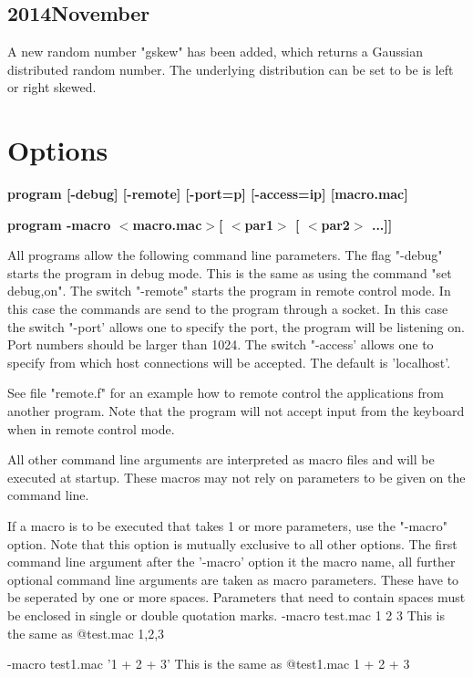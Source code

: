 \subsection*{2014November}
\par
A new random number "gskew" has been added, which returns a 
Gaussian distributed random number. The underlying distribution 
can be set to be is left or right skewed. 
\section{Options}
{\bf program [-debug] [-remote] [-port=p] [-access=ip] [macro.mac] \par }
{\bf program -macro $ <$macro.mac$> $[ $ <$par1$> $ [ $ <$par2$> $ ...]] \par }
\par
\vspace{3pt}
All programs allow the following command line parameters. The flag 
"-debug" starts the program in debug mode. This is the same as using 
the command "set debug,on". The switch "-remote" starts the program 
in remote control mode. In this case the commands are send to the 
program through a socket. In this case the switch "-port' allows one 
to specify the port, the program will be listening on. Port numbers 
should be larger than 1024. The switch "-access' allows one to specify 
from which host connections will be accepted. The default is 
'localhost'. 
\par
See file "remote.f" for an example how to remote control the 
applications from another program. Note that the program will not 
accept input from the keyboard when in remote control mode. 
\par
All other command line arguments are interpreted as macro files 
and will be executed at startup. These macros may not rely on 
parameters to be given on the command line. 
\par
If a macro is to be executed that takes 1 or more parameters, use 
the "-macro" option. Note that this option is mutually exclusive 
to all other options. The first command line argument after  the 
'-macro' option it the macro name, all further optional command 
line arguments are taken as macro parameters. These have to be 
seperated by one or more spaces. 
Parameters that need to contain spaces must be enclosed in single 
or double quotation marks. 
-macro test.mac 1 2 3 
This is the same as @test.mac 1,2,3 
\par
-macro test1.mac '1 + 2 + 3' 
This is the same as @test1.mac 1 + 2 + 3 
